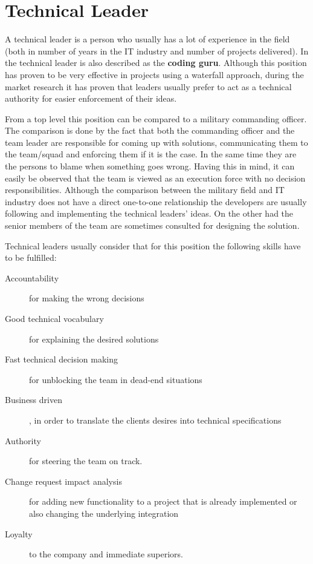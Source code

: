 \section{Technical Leader}
\label{sec:tech-lead}
A technical leader is a person who usually has a lot of experience in the field (both in number of years in the IT industry and number of projects delivered). In \cite{abur-tl} the technical leader is also described as the \textbf{coding guru}. Although this position has proven to be very effective in projects using a waterfall approach, during the market research it has proven that leaders usually prefer to act as a technical authority for easier enforcement of their ideas.

From a top level this position can be compared to a military commanding officer. The comparison is done by the fact that both the commanding officer and the team leader are responsible for coming up with solutions, communicating them to the team/squad and enforcing them if it is the case. In the same time they are the persons to blame when something goes wrong. Having this in mind, it can easily be observed that the team is viewed as an execution force with no decision responsibilities.  Although the comparison between the military field and IT industry does not have a direct one-to-one relationship the developers are usually following and implementing the technical leaders' ideas. On the other had the senior members of the team are sometimes consulted for designing the solution.

Technical leaders usually consider that for this position the following skills have to be fulfilled:
\begin{description}
\item [Accountability] for making the wrong decisions
\item [Good technical vocabulary] for explaining the desired solutions
\item [Fast technical decision making] for unblocking the team in dead-end situations
\item [Business driven], in order to translate the clients desires into technical specifications
\item [Authority] for steering the team on track.
\item [Change request impact analysis] for adding new functionality  to a project that is already implemented or also changing the underlying integration
\item [Loyalty] to the company and immediate superiors.
\end{description}

